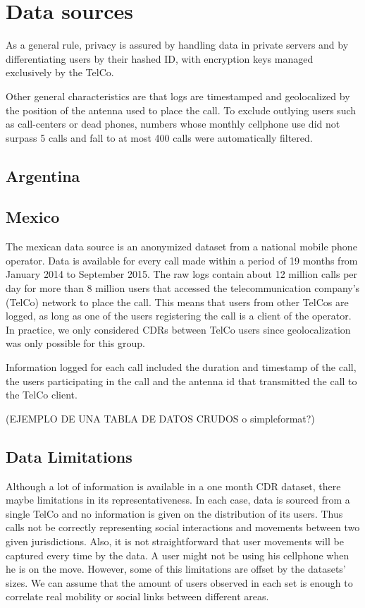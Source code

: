 \section{Data sources}

As a general rule, privacy is assured by handling data in private servers and by differentiating users by their hashed ID, with encryption keys managed exclusively by the TelCo.

Other general characteristics are that logs are timestamped and geolocalized by the position of the antenna used to place the call. To exclude outlying users such as call-centers or dead phones, numbers whose monthly cellphone use did not surpass 5 calls and fall to at most 400 calls were automatically filtered.

\subsection{Argentina}

\subsection{Mexico}

The mexican data source is an anonymized dataset from a national mobile phone operator. Data is available for every call made within a period of 19 months from January 2014 to September 2015. The raw logs contain about 12 million calls per day for more than 8 million users that accessed the telecommunication company's (TelCo) network to place the call. This means that users from other TelCos are logged, as long as one of the users registering the call is a client of the operator. In practice, we only considered CDRs between TelCo users since geolocalization was only possible for this group.

Information logged for each call included the duration and timestamp of the call, the users participating in the call and the antenna id that transmitted the call to the TelCo client. 

(EJEMPLO DE UNA TABLA DE DATOS CRUDOS o simpleformat?)

\subsection{Data Limitations}

Although a lot of information is available in a one month CDR dataset, there maybe limitations in its representativeness. In each case, data is sourced from a single TelCo and no information is given on the distribution of its users. Thus calls not be correctly representing social interactions and movements between two given jurisdictions. Also, it is not straightforward that user movements will be captured every time by the data. A user might not be using his cellphone when he is on the move.
However, some of this limitations are offset by the datasets' sizes. We can assume that the amount of users observed in each set is enough to correlate real mobility or social links between different areas.

